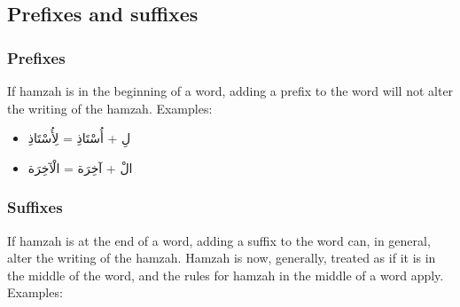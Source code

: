 \documentclass[
  10pt,
]{book}
\providecommand{\tightlist}{%
  \setlength{\itemsep}{0pt}\setlength{\parskip}{0pt}}
\begin{document}
\subsection{Prefixes and suffixes}\label{prefixes-and-suffixes}

\subsubsection{Prefixes}\label{prefixes}

If hamzah is in the beginning of a word, adding a prefix to the word will not alter the writing of the hamzah. Examples:

\begin{itemize}
\tightlist
\item
  \foreignlanguage{arabic}{لِ + أُسْتَاذِ = لِأُسْتَاذِ}\\
\item
  \foreignlanguage{arabic}{الْ + آخِرَة = الْآخِرَة}
\end{itemize}

\subsubsection{Suffixes}\label{suffixes}

If hamzah is at the end of a word, adding a suffix to the word can, in general, alter the writing of the hamzah.
Hamzah is now, generally, treated as if it is in the middle of the word, and the rules for hamzah in the middle of a word apply.
Examples:
\end{document}

